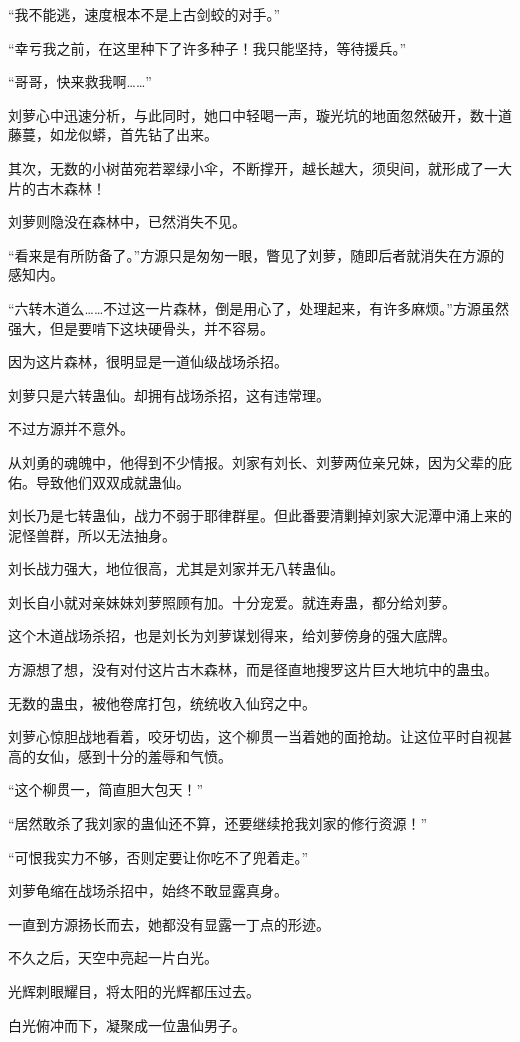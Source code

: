 \begin{this_body}
“我不能逃，速度根本不是上古剑蛟的对手。”

“幸亏我之前，在这里种下了许多种子！我只能坚持，等待援兵。”

“哥哥，快来救我啊……”

刘萝心中迅速分析，与此同时，她口中轻喝一声，璇光坑的地面忽然破开，数十道藤蔓，如龙似蟒，首先钻了出来。

其次，无数的小树苗宛若翠绿小伞，不断撑开，越长越大，须臾间，就形成了一大片的古木森林！

刘萝则隐没在森林中，已然消失不见。

“看来是有所防备了。”方源只是匆匆一眼，瞥见了刘萝，随即后者就消失在方源的感知内。

“六转木道么……不过这一片森林，倒是用心了，处理起来，有许多麻烦。”方源虽然强大，但是要啃下这块硬骨头，并不容易。

因为这片森林，很明显是一道仙级战场杀招。

刘萝只是六转蛊仙。却拥有战场杀招，这有违常理。

不过方源并不意外。

从刘勇的魂魄中，他得到不少情报。刘家有刘长、刘萝两位亲兄妹，因为父辈的庇佑。导致他们双双成就蛊仙。

刘长乃是七转蛊仙，战力不弱于耶律群星。但此番要清剿掉刘家大泥潭中涌上来的泥怪兽群，所以无法抽身。

刘长战力强大，地位很高，尤其是刘家并无八转蛊仙。

刘长自小就对亲妹妹刘萝照顾有加。十分宠爱。就连寿蛊，都分给刘萝。

这个木道战场杀招，也是刘长为刘萝谋划得来，给刘萝傍身的强大底牌。

方源想了想，没有对付这片古木森林，而是径直地搜罗这片巨大地坑中的蛊虫。

无数的蛊虫，被他卷席打包，统统收入仙窍之中。

刘萝心惊胆战地看着，咬牙切齿，这个柳贯一当着她的面抢劫。让这位平时自视甚高的女仙，感到十分的羞辱和气愤。

“这个柳贯一，简直胆大包天！”

“居然敢杀了我刘家的蛊仙还不算，还要继续抢我刘家的修行资源！”

“可恨我实力不够，否则定要让你吃不了兜着走。”

刘萝龟缩在战场杀招中，始终不敢显露真身。

一直到方源扬长而去，她都没有显露一丁点的形迹。

不久之后，天空中亮起一片白光。

光辉刺眼耀目，将太阳的光辉都压过去。

白光俯冲而下，凝聚成一位蛊仙男子。


\end{this_body}
